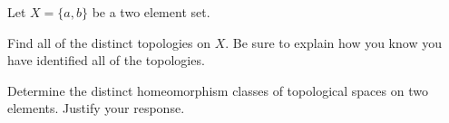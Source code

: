 \begin{comment}
If $P = \emptyset$, we are done. Suppose $P$ is non-empty. We must show that $P = A$. We proceed by contradiction. Suppose $P \neq A$. Then there is an element $x \in A-P$. Let $P_x$ be the set of all points in $P$ that are greater than $x$, that is $$P_x = \{p \in P \mid p>x\}.$$ Since $x$ is a lower bound for $P_x$, the set $P_x$ has a greatest lower bound. Let $$l = \text{glb}=(P_x).$$ We will show that $l$ is a limit point of $P$. To this end, we will show that every open ball centered at $l$ contains a point of $P$ different from $l$. 

Let $\epsilon$ be greater than 0 and consider the open ball $B(l,\epsilon)$. Suppose $$B(l,\epsilon) \cap P_x = \emptyset.$$ Let $m = \frac{l+\epsilon}{2}$. Then there are no elements of $P_x$ between $l$ and $m$. This makes $m$ a lower bound of $P_x$. But  $m > l$. This contradicts the fact that $l$ is the greatest lower bound for $P_x$. We must therefore have that every open ball around $l$ intersects $P_x$. Since $l$ is not in $P$, $l$ cannot be in $P_x$. So every open ball around $l$ contains a point of $P_x \subset P$ different from $l$. This shows that $l \in P'$, the set of limit points of $P$. Recall that $P$ is closed. This means that $P$ contains its limit points. Thus $l \in P$, a contradiction. Q.E.D. \\

To complete the problem, we must show that $A$ and $B$ cannot be homeomorphic. If there is a homeomorphism $f:A \to B$, then $f$ is continuous. Since $S = (c,d)$ is both open and closed in $B$, then $f^{-1}(S)$ is both open and closed in $A$. Therefore, $f^{-1}(S) = \emptyset$ or $f^{-1}(S) = A$. In the former case, there are no elements in $A$ that map to $S$. In the latter case, everything in $A$ maps to $S$. In neither case would $f$ be a surjection, and thus not a homeomorphism. 

\ea

\end{comment}

\item Let $X = \{a,b\}$ be a two element set. 
\ba

\item Find all of the distinct topologies on $X$. Be sure to explain how you know you have identified all of the topologies. 

\item Determine the distinct homeomorphism classes of topological spaces on two elements. Justify your response.

\ea

